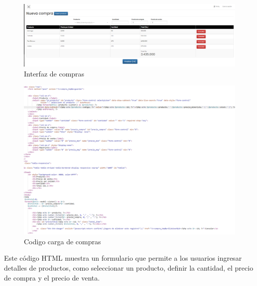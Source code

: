 \begin{figure}[H]
    \begin{center}
      \includegraphics[scale=0.30]{./sistema/compras.png}
      \caption{Interfaz de compras }
      \label{fig:product}
    \end{center}
  \end{figure}
  \begin{figure}[H]
    \begin{center}
      \includegraphics[scale=0.55]{./sistema/codigo_compra.png}
      \caption{Codigo carga de compras }
      \label{fig:product}
    \end{center}
  \end{figure}
  Este código HTML muestra un formulario que permite a los usuarios ingresar detalles de productos, como seleccionar un producto, definir la cantidad, el precio de compra y el precio de venta.

